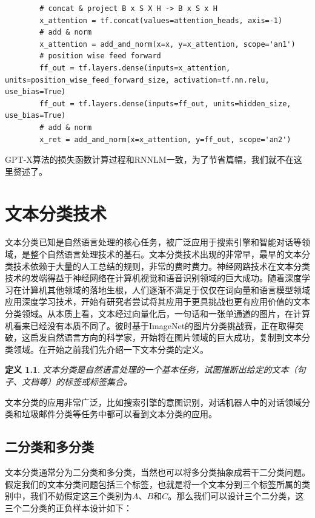 \documentclass[twoside,a4paper,12pt]{book}%
\newtheorem{definition}{定义}
\begin{document}
\begin{lstlisting}
		# concat & project B x S X H -> B x S x H
		x_attention = tf.concat(values=attention_heads, axis=-1)
		# add & norm
		x_attention = add_and_norm(x=x, y=x_attention, scope='an1')
		# position wise feed forward
		ff_out = tf.layers.dense(inputs=x_attention, units=position_wise_feed_forward_size, activation=tf.nn.relu, use_bias=True)
		ff_out = tf.layers.dense(inputs=ff_out, units=hidden_size, use_bias=True)
		# add & norm
		x_ret = add_and_norm(x=x_attention, y=ff_out, scope='an2')
\end{lstlisting}
\gls{GPT}-X算法的损失函数计算过程和\gls{RNNLM}一致，为了节省篇幅，我们就不在这里赘述了。

\chapter{文本分类技术}
文本分类已知是自然语言处理的核心任务，被广泛应用于搜索引擎和智能对话等领域，是整个自然语言处理技术的基石。文本分类技术出现的非常早，最早的文本分类技术依赖于大量的人工总结的规则，非常的费时费力。神经网路技术在文本分类技术的发端得益于神经网络在计算机视觉和语音识别领域的巨大成功。随着深度学习在计算机其他领域的落地生根，人们逐渐不满足于仅仅在词向量和语言模型领域应用深度学习技术，开始有研究者尝试将其应用于更具挑战也更有应用价值的文本分类领域。从本质上看，文本经过向量化后，一句话和一张单通道的图片，在计算机看来已经没有本质不同了。彼时基于ImageNet的图片分类挑战赛，正在取得突破，这启发自然语言方向的科学家，开始将在图片领域的巨大成功，复制到文本分类领域。在开始之前我们先介绍一下文本分类的定义。
\begin{definition}
文本分类是自然语言处理的一个基本任务，试图推断出给定的文本（句子、文档等）的标签或标签集合。
\end{definition}
文本分类的应用非常广泛，比如搜索引擎的意图识别，对话机器人中的对话领域分类和垃圾邮件分类等任务中都可以看到文本分类的应用。
\section{二分类和多分类}
文本分类通常分为二分类和多分类，当然也可以将多分类抽象成若干二分类问题。假定我们的文本分类问题包括三个标签，也就是将一个文本分到三个标签所属的类别中，我们不妨假定这三个类别为$A$、$B$和$C$。那么我们可以设计三个二分类，这三个二分类的正负样本设计如下：
\begin{table}[h]
	\caption{计划进度}  
	\label{tab:schedule}
	\centering
\end{table}
\end{document}
